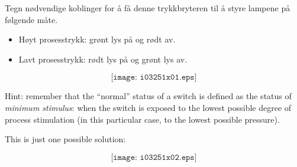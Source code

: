 

Tegn nødvendige koblinger for å få denne trykkbryteren til å styre lampene på følgende måte. 

\begin{itemize}
\item{} Høyt prosesstrykk: grønt lys på og rødt av.
\item{} Lavt prosesstrykk: rødt lys på og grønt lys av.
\end{itemize}

$$\texttt{[image: i03251x01.eps]}$$

Hint: remember that the ``normal'' status of a switch is defined as the status of {\it minimum stimulus}: when the switch is exposed to the lowest possible degree of process stimulation (in this particular case, to the lowest possible pressure).







This is just one possible solution:

$$\texttt{[image: i03251x02.eps]}$$
 











